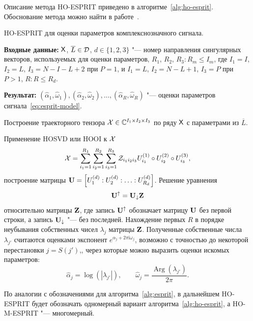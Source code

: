 \documentclass[specialist,
  substylefile=spbu_report.rtx,
subf,href,colorlinks=true, 12pt]{disser}
\theoremstyle{plain}
\theoremstyle{definition}
\theoremstyle{remark}
\newcommand{\Input}{\textbf{Входные данные: }}
\newcommand{\Output}{\textbf{Результат: }}
\newcommand{\iu}{\mathrm{i}}
\begin{document}
Описание метода HO-ESPRIT приведено в алгоритме~\ref{alg:ho-esprit}.
Обоснование метода можно найти в работе~\cite{hosvd-hooi-separation}.
\begin{algorithm}[!ht]
  \caption{HO-ESPRIT для оценки параметров комплекснозначного сигнала.}
  \label{alg:ho-esprit}
  \Input $\mathsf{X}$, $\overline{L} \in \mathcal{D}$,
  $d\in \{1, 2, 3\}$ "--- номер направления сингулярных векторов,
  используемых для оценки параметров,
  $R_1$, $R_2$, $R_3: R_m \leqslant I_m$, где
  $I_1=I$, $I_2=L$, $I_3=N-I-L+2$ при $P=1$, и
  $I_1=L$, $I_2=N-L+1$, $I_3=P$ при $P >1$,
  $R: R\leqslant R_d$.

  \Output $\left(\widehat{\alpha}_1, \widehat{\omega}_1\right),
  \left(\widehat{\alpha}_2, \widehat{\omega}_2\right), \ldots,
  \left(\widehat{\alpha}_R, \widehat{\omega}_R\right)$ "--- оценки параметров
  сигнала~\eqref{eq:esprit-model}.
  \begin{algorithmic}[1]
    \State Построение траекторного тензора $\mathcal{X}\in \mathbb{C}^{I_1\times
    I_2 \times I_3}$
    по ряду $\mathsf{X}$ с параметрами из $\overline{L}$.

    \State Применение HOSVD или HOOI к $\mathcal{X}$
    \[
      \mathcal{X} = \sum_{i_1=1}^{R_1} \sum_{i_2=1}^{R_2} \sum_{i_3=1}^{R_3}
      \mathcal{Z}_{i_1 i_2 i_3} U_{i_1}^{(1)}\circ U_{i_2}^{(2)} \circ
      U_{i_3}^{(3)},
    \]
    построение матрицы $\mathbf{U} = \left[U_1^{(d)}:U_2^{(d)}:\ldots:
    U_{R_d}^{(d)}\right]$.
    \State Решение уравнения
    \[
      \mathbf{U}^{\uparrow}=\mathbf{U}_{\downarrow}\mathbf{Z}
    \]
    относительно матрицы $\mathbf{Z}$, где запись $\mathbf{U}^{\uparrow}$
    обозначает матрицу $\mathbf{U}$ без первой строки,
    а запись $\mathbf{U}_{\downarrow}$ "--- без последней.
    \State Нахождение первых $R$ в порядке неубывания собственных
    чисел $\lambda_j$ матрицы $\mathbf{Z}$.
    Полученные собственные числа $\lambda_{j'}$ считаются оценками
    экспонент $e^{\alpha_j + 2\pi\iu \omega_j}$, возможно с точностью
    до некоторой перестановки
    $j = S (j')$,, через которые можно выразить
    оценки искомых параметров:
    \[
      \widehat{\alpha}_j = \log\left(\left|\lambda_{j'}\right|\right), \qquad
      \widehat{\omega}_j =
      \frac{\operatorname{Arg}\left(\lambda_{j'}\right)}{2 \pi}.
    \]
  \end{algorithmic}
\end{algorithm}

По аналогии с обозначениями для алгоритма~\ref{alg:esprit},
в дальнейшем HO-ESPRIT будет обозначать одномерный вариант
алгоритма~\ref{alg:ho-esprit}, а HO-M-ESPRIT "--- многомерный.
\end{document}
